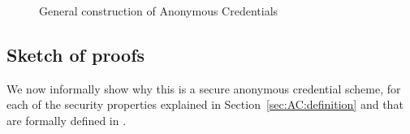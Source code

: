 \begin{figure*}
\begin{pcvstack}[center]
	\pcvspace
	\begin{pchstack}
		\pchspace[2em]
	\end{pchstack}
\end{pcvstack}
\caption{\label{fig:general_construction_AC}General construction of Anonymous Credentials}
\end{figure*}

\subsection{Sketch of proofs}\label{sec:sketch_proof_secu_AC}

We now informally show why this is a secure anonymous credential scheme, 
for each of the security properties explained in 
Section~\ref{sec:AC:definition} and that are formally defined in 
\cite[Appendix G.1]{ISC:BosCamNev18}.


